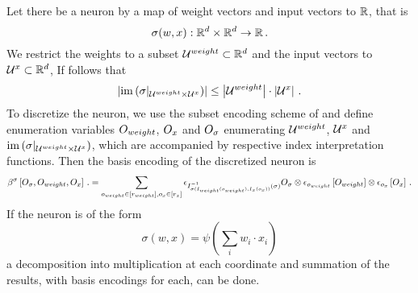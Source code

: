 \begin{example}
    Let there be a neuron by a map of weight vectors and input vectors to $\mathbb{R}$, that is
    \[ \sigma( w, x) : \mathbb{R}^{d} \times \mathbb{R}^{d} \rightarrow \mathbb{R} \, .\]
    We restrict the weights to a subset $\mathcal{U}^{weight}\subset\mathbb{R}^{d}$ and the input vectors to $\mathcal{U}^{x}\subset\mathbb{R}^{d}$,
    If follows that
    \[ \left|\mathrm{im}\left({\sigma}|_{\mathcal{U}^{weight}\times\mathcal{U}^{x}}\right)\right| \leq \left|\mathcal{U}^{weight}\right| \cdot \left|\mathcal{U}^{x}\right| \, . \]
    To discretize the neuron, we use the subset encoding scheme of  and define enumeration variables $O_{weight}$, $O_{x}$ and $O_{\sigma}$ enumerating $\mathcal{U}^{weight}$, $\mathcal{U}^{x}$ and $\mathrm{im}\left({\sigma}|_{\mathcal{U}^{weight}\times\mathcal{U}^{x}}\right)$, which are accompanied by respective index interpretation functions.
    Then the basis encoding of the discretized neuron is
    \begin{align*}
        \beta^{\sigma}\left[O_{\sigma},O_{weight},O_{x}\right] \, .
        = \sum_{o_{weight}\in[r_{weight}],o_{x}\in[r_{x}]}
        \epsilon_{I_{\sigma(I_{weight}(o_{weight}),I_{x}(o_{x}))}^{-1}(\sigma)}{O_{\sigma}}
        \otimes \epsilon_{o_{weight}}\left[O_{weight}\right]
        \otimes \epsilon_{o_{x}}\left[O_{x}\right] \, .
    \end{align*}
    If the neuron is of the form
    \[ \sigma(w,x) = \psi(\sum_i w_i \cdot x_i)\]
    a decomposition into multiplication at each coordinate and summation of the results, with basis encodings for each, can be done.
\end{example}
